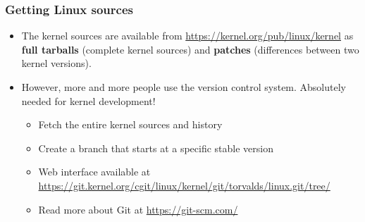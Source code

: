 \begin{frame}
  \frametitle{Getting Linux sources}
  \begin{itemize}
  \item The kernel sources are available from
    \url{https://kernel.org/pub/linux/kernel} as {\bf full tarballs}
    (complete kernel sources) and {\bf patches} (differences between
    two kernel versions).
  \item However, more and more people use the  version
    control system. Absolutely needed for kernel development!
    \begin{itemize}
    \item Fetch the entire kernel sources and history\\
    \item Create a branch that starts at a specific stable version\\
    \item Web interface available at
      \url{https://git.kernel.org/cgit/linux/kernel/git/torvalds/linux.git/tree/}
    \item Read more about Git at \url{https://git-scm.com/}
    \end{itemize}
  \end{itemize}
\end{frame}

